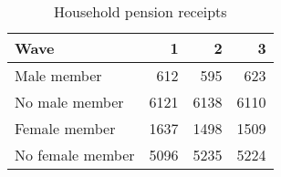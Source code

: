
\begin{table}
\centering
\caption{Household pension receipts}
    \begin{tabular}{l|rrr}
    \hline
    Wave             & 1    & 2    & 3    \\
    \hline
    Male member      & 612  & 595  & 623  \\
    No male member   & 6121 & 6138 & 6110 \\
    Female member    & 1637 & 1498 & 1509 \\
    No female member & 5096 & 5235 & 5224 \\
    \end{tabular}
\end{table}

